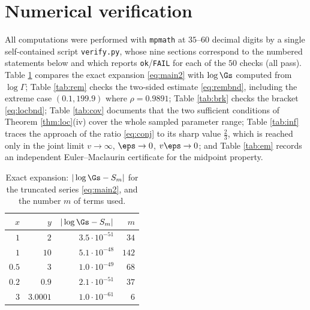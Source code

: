 
\section{Numerical verification}\label{sec:num}

All computations were performed with \texttt{mpmath} at $35$--$60$ decimal digits by a
single self-contained script \texttt{verify.py}, whose nine sections correspond to the
numbered statements below and which reports \texttt{ok}/\texttt{FAIL} for each of the $50$
checks (all pass). Table \ref{tab:exp} compares the exact expansion
\eqref{eq:main2} with $\log\Gs$ computed from $\log\Gamma$; Table \ref{tab:rem} checks the
two-sided estimate \eqref{eq:rembnd}, including the extreme case $(0.1,199.9)$ where
$\rho=0.9891$; Table \ref{tab:brk} checks the bracket \eqref{eq:locbnd}; Table
\ref{tab:cov} documents that the two sufficient conditions of Theorem \ref{thm:loc}(iv)
cover the whole sampled parameter range; Table \ref{tab:inf} traces the approach of the
ratio \eqref{eq:conj} to its sharp value $\frac23$, which is reached only in the joint
limit $v\to\infty$, $\eps\to0$, $v\eps\to0$; and Table \ref{tab:em}
records an independent Euler--Maclaurin certificate for the midpoint property.

\begin{table}[htbp]\centering\small
\caption{Exact expansion: $|\log\Gs-S_m|$ for the truncated series \eqref{eq:main2}, and
the number $m$ of terms used.}
\label{tab:exp}
\begin{tabular}{rrrr}
\toprule
$x$ & $y$ & $|\log\Gs-S_{m}|$ & $m$\\
\midrule
$1$ & $2$ & $3.5\cdot10^{-51}$ & $34$\\
$1$ & $10$ & $5.1\cdot10^{-48}$ & $142$\\
$0.5$ & $3$ & $1.0\cdot10^{-49}$ & $68$\\
$0.2$ & $0.9$ & $2.1\cdot10^{-51}$ & $37$\\
$3$ & $3.0001$ & $1.0\cdot10^{-61}$ & $6$\\
\bottomrule
\end{tabular}
\end{table}


